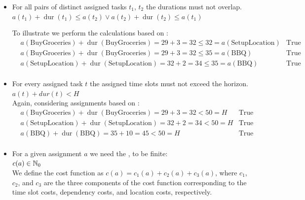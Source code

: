 \begin{itemize}
      \item For all pairs of distinct assigned tasks $t_1$, $t_2$ the durations must not overlap. \\
            $a(t_1) + \operatorname{dur}(t_1) \leq a(t_2) \lor a(t_2) + \operatorname{dur}(t_2) \leq a(t_1)$

            To illustrate we perform the calculations based on :
            \begin{align*}
                   & a(\text{BuyGroceries}) + \operatorname{dur}(\text{BuyGroceries}) = 29 + 3 = 32 \leq 32 = a(\text{SetupLocation}) & \text{True} \\
                   & a(\text{BuyGroceries}) + \operatorname{dur}(\text{BuyGroceries}) = 29 + 3 = 32 \leq 35 = a(\text{BBQ})           & \text{True} \\
                   & a(\text{SetupLocation}) + \operatorname{dur}(\text{SetupLocation}) = 32 + 2 = 34 \leq 35 = a(\text{BBQ})         & \text{True} \\
            \end{align*}
      \item For every assigned task $t$ the assigned time slots must not exceed the horizon.\\
            $a(t) + \textit{dur}(t) < H$ \\
            Again, considering assignments based on :
            \begin{align*}
                   & a(\text{BuyGroceries}) + \operatorname{dur}(\text{BuyGroceries}) = 29 + 3 = 32 < 50 = H   & \text{True} \\
                   & a(\text{SetupLocation}) + \operatorname{dur}(\text{SetupLocation}) = 32 + 2 = 34 < 50 = H & \text{True} \\
                   & a(\text{BBQ}) + \operatorname{dur}(\text{BBQ}) = 35 + 10 = 45 < 50 = H                    & \text{True} \\
            \end{align*}
      \item For a given assignment $a$ we need the , to be finite: \\
            $c(a) \in \mathbb{N}_0$ \\
            We define the cost function as $c(a) = c_1(a) + c_2(a) + c_3(a)$, where $c_1$, $c_2$, and $c_3$ are the three components of the cost function corresponding to the time slot costs, dependency costs, and location costs, respectively.

\end{itemize}
